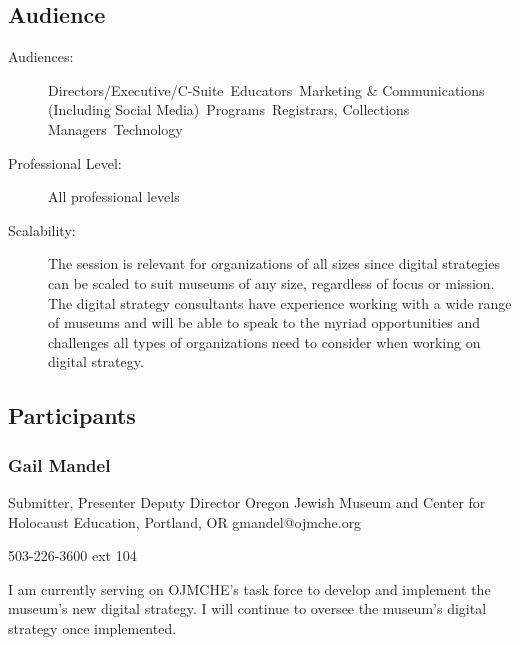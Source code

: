 \documentclass{report}
\begin{document}
              \subsection*{Audience}
                \begin{description}
                  \item [Audiences:]Directors/Executive/C-Suite~Educators~Marketing \& Communications (Including Social Media)~Programs~Registrars, Collections Managers~Technology~
                  \item[Professional Level:]All professional levels~
                \item[Scalability:]  The session is relevant for organizations of all sizes since digital strategies can be scaled to suit museums of any size, regardless of focus or mission. The digital strategy consultants have experience working with a wide range of museums and will be able to speak to the myriad opportunities and challenges all types of organizations need to consider when working on digital strategy. 
  

							
              \end{description}
            \subsection*{Participants}
              \subsubsection*{ Gail Mandel }
              Submitter, Presenter\newline
              Deputy Director\newline
              Oregon Jewish Museum and Center for Holocaust Education, Portland, OR
              \newline
              gmandel@ojmche.org\newline
              
              503-226-3600 ext 104\newline

              I am currently serving on OJMCHE's task force to develop and implement the museum's new digital strategy. I will continue to oversee the museum's digital strategy once implemented.\newline


              

              
\end{document}
